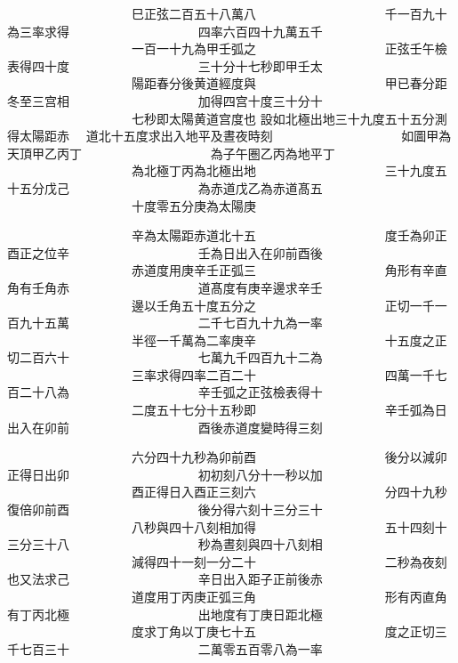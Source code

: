 \begin{正文}
　　　　　　　　　　巳正弦二百五十八萬八
　　　　　　　　　　千一百九十為三率求得
　　　　　　　　　　四率六百四十九萬五千
　　　　　　　　　　一百一十九為甲壬弧之
　　　　　　　　　　正弦壬午檢表得四十度
　　　　　　　　　　三十分十七秒即甲壬太
　　　　　　　　　　陽距春分後黄道經度與
　　　　　　　　　　甲已春分距冬至三宫相
　　　　　　　　　　加得四宫十度三十分十
　　　　　　　　　　七秒即太陽黄道宫度也
設如北極出地三十九度五十五分測得太陽距赤
　道北十五度求出入地平及晝夜時刻
　　　　　　　　　　如圖甲為天頂甲乙丙丁
　　　　　　　　　　為子午圏乙丙為地平丁
　　　　　　　　　　為北極丁丙為北極出地
　　　　　　　　　　三十九度五十五分戊己
　　　　　　　　　　為赤道戊乙為赤道髙五
　　　　　　　　　　十度零五分庚為太陽庚
\par
\end{正文}\clearpage
{}
\begin{正文}
　　　　　　　　　　辛為太陽距赤道北十五
　　　　　　　　　　度壬為卯正酉正之位辛
　　　　　　　　　　壬為日出入在卯前酉後
　　　　　　　　　　赤道度用庚辛壬正弧三
　　　　　　　　　　角形有辛直角有壬角赤
　　　　　　　　　　道髙度有庚辛邊求辛壬
　　　　　　　　　　邊以壬角五十度五分之
　　　　　　　　　　正切一千一百九十五萬
　　　　　　　　　　二千七百九十九為一率
　　　　　　　　　　半徑一千萬為二率庚辛
　　　　　　　　　　十五度之正切二百六十
　　　　　　　　　　七萬九千四百九十二為
　　　　　　　　　　三率求得四率二百二十
　　　　　　　　　　四萬一千七百二十八為
　　　　　　　　　　辛壬弧之正弦檢表得十
　　　　　　　　　　二度五十七分十五秒即
　　　　　　　　　　辛壬弧為日出入在卯前
　　　　　　　　　　酉後赤道度變時得三刻
\par
\end{正文}\clearpage
{}
\begin{正文}
　　　　　　　　　　六分四十九秒為卯前酉
　　　　　　　　　　後分以減卯正得日出卯
　　　　　　　　　　初初刻八分十一秒以加
　　　　　　　　　　酉正得日入酉正三刻六
　　　　　　　　　　分四十九秒復倍卯前酉
　　　　　　　　　　後分得六刻十三分三十
　　　　　　　　　　八秒與四十八刻相加得
　　　　　　　　　　五十四刻十三分三十八
　　　　　　　　　　秒為晝刻與四十八刻相
　　　　　　　　　　減得四十一刻一分二十
　　　　　　　　　　二秒為夜刻也又法求己
　　　　　　　　　　辛日出入距子正前後赤
　　　　　　　　　　道度用丁丙庚正弧三角
　　　　　　　　　　形有丙直角有丁丙北極
　　　　　　　　　　出地度有丁庚日距北極
　　　　　　　　　　度求丁角以丁庚七十五
　　　　　　　　　　度之正切三千七百三十
　　　　　　　　　　二萬零五百零八為一率
\par
\end{正文}\clearpage
